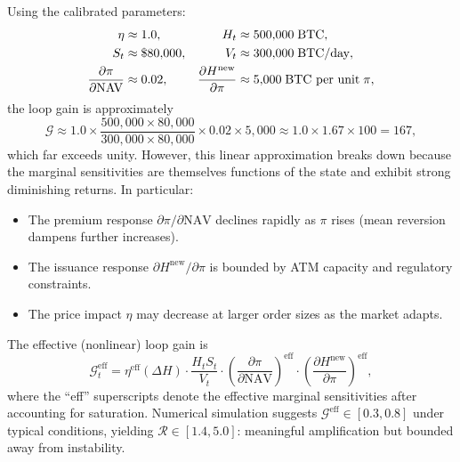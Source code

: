 \begin{corollary}\label{cor:loop_gain}
Using the calibrated parameters:
\begin{align}
  \eta &\approx 1.0, &
  H_t &\approx 500{,}000\;\text{BTC}, \notag \\
  S_t &\approx \$80{,}000, &
  V_t &\approx 300{,}000\;\text{BTC/day}, \notag \\
  \frac{\partial\pi}{\partial\mathrm{NAV}} &\approx 0.02, &
  \frac{\partial H^{\mathrm{new}}}{\partial\pi} &\approx 5{,}000
    \;\text{BTC per unit}\;\pi,
\end{align}
the loop gain is approximately
\begin{equation}\label{eq:G_calibrated}
  \mathcal{G} \approx 1.0 \times \frac{500{,}000 \times 80{,}000}
  {300{,}000 \times 80{,}000} \times 0.02 \times 5{,}000
  \approx 1.0 \times 1.67 \times 100
  = 167,
\end{equation}
which far exceeds unity.  However, this linear approximation breaks down
because the marginal sensitivities are themselves functions of the state
and exhibit strong diminishing returns.  In particular:
\begin{itemize}
  \item The premium response $\partial\pi/\partial\mathrm{NAV}$ declines
    rapidly as $\pi$ rises (mean reversion dampens further increases).
  \item The issuance response $\partial H^{\mathrm{new}}/\partial\pi$
    is bounded by ATM capacity and regulatory constraints.
  \item The price impact $\eta$ may decrease at larger order sizes
    as the market adapts.
\end{itemize}
The effective (nonlinear) loop gain is
\begin{equation}\label{eq:G_effective}
  \mathcal{G}_t^{\mathrm{eff}}
  = \eta^{\mathrm{eff}}(\Delta H)
    \cdot \frac{H_t S_t}{V_t}
    \cdot \left(\frac{\partial\pi}{\partial\mathrm{NAV}}\right)^{\mathrm{eff}}
    \cdot \left(\frac{\partial H^{\mathrm{new}}}
    {\partial\pi}\right)^{\mathrm{eff}},
\end{equation}
where the ``eff'' superscripts denote the effective marginal sensitivities
after accounting for saturation.  Numerical simulation suggests
$\mathcal{G}^{\mathrm{eff}} \in [0.3, 0.8]$ under typical conditions,
yielding $\mathcal{R} \in [1.4, 5.0]$: meaningful amplification but
bounded away from instability.
\end{corollary}


